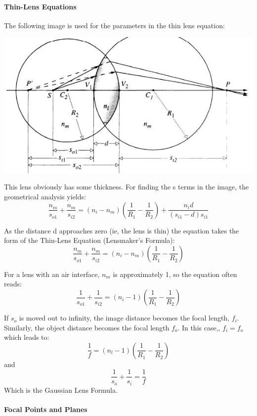\documentclass[12pt]{report}
\begin{document}
\paragraph{Thin-Lens Equations}
The following image is used for the parameters in the thin lens equation: 

\includegraphics[scale=.75]{ThinLens.jpg}

This lens obviously has some thickness. For finding the s terms in the image, the geometrical analysis yields: \[\frac{n_m}{s_{o1}}+\frac{n_m}{s_{i2}} = (n_i-n_m)\left(\frac{1}{R_1}-\frac{1}{R_2}\right)+\frac{n_id}{(s_{i1}-d)s_{i1}} \]

As the distance d approaches zero (ie, the lens is thin) the equation takes the form of the Thin-Lens Equation (Lensmaker's Formula):
\begin{equation}
\frac{n_m}{s_{o1}}+\frac{n_m}{s_{i2}} = (n_i-n_m)\left(\frac{1}{R_1}-\frac{1}{R_2}\right)
\end{equation}

For a lens with an air interface, $n_m$ is approximately 1, so the equation often reads:
\[\frac{1}{s_{o1}}+\frac{1}{s_{i2}} = (n_i-1)\left(\frac{1}{R_1}-\frac{1}{R_2}\right)\]

If $s_o$ is moved out to infinity, the image distance becomes the focal length, $f_i$. Similarly, the object distance becomes the focal length $f_o$. In this case,, $f_i = f_o$ which leads to:
\begin{equation}
\frac{1}{f} = (n_l - 1)\left(\frac{1}{R_1}-\frac{1}{R_2}\right)
\end{equation}
and
\begin{equation}
\frac{1}{s_o}+\frac{1}{s_i} = \frac{1}{f}
\end{equation}
Which is the Gaussian Lens Formula. 

\paragraph{Focal Points and Planes}
\end{document}

